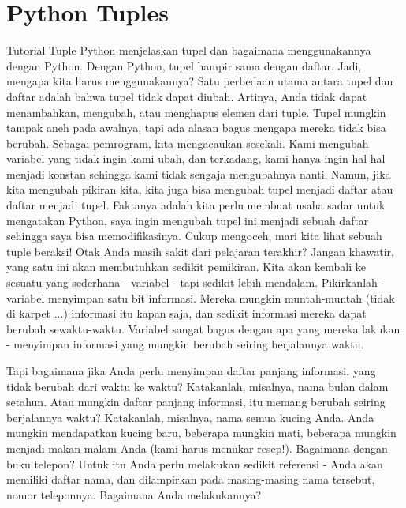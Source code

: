 \section{Python Tuples} 
Tutorial Tuple Python menjelaskan tupel dan bagaimana menggunakannya dengan Python. Dengan Python, tupel hampir sama dengan daftar. Jadi, mengapa kita harus menggunakannya? Satu perbedaan utama antara tupel dan daftar adalah bahwa tupel tidak dapat diubah. Artinya, Anda tidak dapat menambahkan, mengubah, atau menghapus elemen dari tuple. Tupel mungkin tampak aneh pada awalnya, tapi ada alasan bagus mengapa mereka tidak bisa berubah. Sebagai pemrogram, kita mengacaukan sesekali. Kami mengubah variabel yang tidak ingin kami ubah, dan terkadang, kami hanya ingin hal-hal menjadi konstan sehingga kami tidak sengaja mengubahnya nanti. Namun, jika kita mengubah pikiran kita, kita juga bisa mengubah tupel menjadi daftar atau daftar menjadi tupel. Faktanya adalah kita perlu membuat usaha sadar untuk mengatakan Python, saya ingin mengubah tupel ini menjadi sebuah daftar sehingga saya bisa memodifikasinya. Cukup mengoceh, mari kita lihat sebuah tuple beraksi!
Otak Anda masih sakit dari pelajaran terakhir? Jangan khawatir, yang satu ini akan membutuhkan sedikit pemikiran. Kita akan kembali ke sesuatu yang sederhana - variabel - tapi sedikit lebih mendalam. Pikirkanlah - variabel menyimpan satu bit informasi. Mereka mungkin muntah-muntah (tidak di karpet ...) informasi itu kapan saja, dan sedikit informasi mereka dapat berubah sewaktu-waktu. Variabel sangat bagus dengan apa yang mereka lakukan - menyimpan informasi yang mungkin berubah seiring berjalannya waktu. 

Tapi bagaimana jika Anda perlu menyimpan daftar panjang informasi, yang tidak berubah dari waktu ke waktu? Katakanlah, misalnya, nama bulan dalam setahun. Atau mungkin daftar panjang informasi, itu memang berubah seiring berjalannya waktu? Katakanlah, misalnya, nama semua kucing Anda. Anda mungkin mendapatkan kucing baru, beberapa mungkin mati, beberapa mungkin menjadi makan malam Anda (kami harus menukar resep!). Bagaimana dengan buku telepon? Untuk itu Anda perlu melakukan sedikit referensi - Anda akan memiliki daftar nama, dan dilampirkan pada masing-masing nama tersebut, nomor teleponnya. Bagaimana Anda melakukannya?


